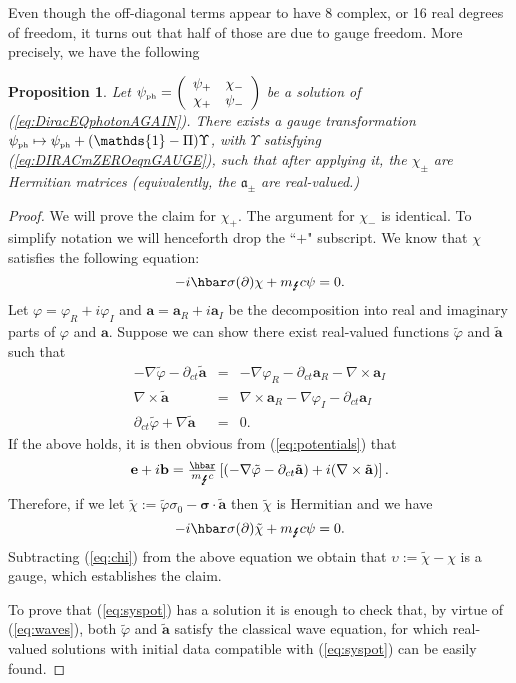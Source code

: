 \documentclass[12pt]{article}
\newtheorem{prop}[thm]{Proposition}
\theoremstyle{definition}
\newcommand{\refeq}[1]{(\ref{#1})}
\numberwithin{equation}{section}
\newcommand{\fa}{\mathfrak{a}}
\newcommand{\bb}{\mathbf{b}}
\newcommand{\ba}{\mathbf{a}}
\newcommand{\bfa}{\boldsymbol{\fa}}
\newcommand{\be}{\mathbf{e}}
\newcommand{\beq}{\begin{equation}}
\newcommand{\eeq}{\end{equation}}
\newcommand{\Id}{\mathds{1}}
\newcommand{\p}{\partial}
\newcommand{\siV}{\boldsymbol{\sigma}}
\newcommand{\psiPH}{{\psi_{\mbox{\rm\tiny ph}}}}
\newcommand{\mPH}{{m_{\mbox{\Lightning}}}}
\newcommand{\si}{\sigma}
\newcommand{\nab}{\nabla}
\newcommand{\bna}{\begin{eqnarray}}
\newcommand{\ena}{\end{eqnarray}}
\begin{document}
Even though the off-diagonal terms appear to have 8 complex, or 16 real degrees of freedom, 
it turns out that half of those are due to gauge freedom. 
 More precisely, we have the following
\begin{prop}
Let $\psiPH = \left(\begin{array}{cc} \psi_+ & \chi_-\\ \chi_+ & \psi_- \end{array} \right)$ be a solution of \refeq{eq:DiracEQphotonAGAIN}. 
 There exists a gauge transformation $\psiPH \mapsto \psiPH + (\Id - \Pi)\Upsilon$, with $\Upsilon$ satisfying \refeq{eq:DIRACmZEROeqnGAUGE},
 such that after applying it, the $\chi_\pm$ are Hermitian matrices (equivalently, 
the $\bfa_\pm$ are real-valued.)
\end{prop}
\begin{proof}
 We will prove the claim for $\chi_+$. 
 The argument for $\chi_-$ is identical. 
 To simplify notation we will henceforth drop the ``$+$" subscript. 
We know that $\chi$ satisfies the following equation:
\beq\label{eq:chi}
-i\hbar \si(\p) \chi + \mPH c \psi = 0.
\eeq
Let $\varphi= \varphi_R + i\varphi_I$ and $\ba =\ba_R + i \ba_I$  be the decomposition into real and imaginary parts of $\varphi$ and $\ba$. 
 Suppose we can show there exist real-valued functions $\tilde{\varphi}$ and $\tilde{\ba}$ such that 
\bna
-\nab \tilde{\varphi} - \p_{ct} \tilde{\ba} & = & - \nab \varphi_R - \p_{ct} \ba_R - \nab \times \ba_I \nonumber\\
\nab \times \tilde{\ba} & = & \nab \times \ba_R - \nab \varphi_I - \p_{ct} \ba_I \label{eq:syspot} \\
\p_{ct} \tilde{\varphi} + \nab \tilde{\ba} & = & 0. \nonumber
\ena
 If the above holds, it is then obvious from \refeq{eq:potentials} that 
\beq
\be+i \bb = \tfrac{\hbar}{\mPH c}\left[ (-\nab \tilde{\varphi} - \p_{ct} \tilde{\ba}) + i ( \nab \times \tilde{\ba})\right].
\eeq
 Therefore, if we let $\tilde{\chi} := \tilde{\varphi} \si_0 - \siV \cdot \tilde{\ba}$ then $\tilde{\chi}$ is Hermitian and we have 
\beq
-i\hbar \si(\p)\tilde{\chi} + \mPH c \psi = 0.
\eeq
Subtracting \refeq{eq:chi} from the above equation we obtain that $\upsilon := \tilde{\chi} - \chi$ is a gauge, which establishes the claim.

To prove that \refeq{eq:syspot} has a solution it is enough to check that, by virtue of \refeq{eq:waves}, both $\tilde{\varphi}$ and 
$\tilde{\ba}$ satisfy the classical wave equation, for which real-valued solutions with initial data compatible with \refeq{eq:syspot} 
can be easily found. 
\end{proof}
\end{document}
